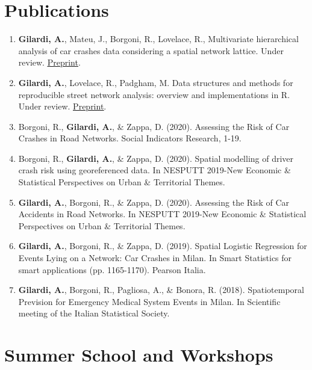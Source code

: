 \documentclass[11pt,a4paper,sans]{moderncv}
\begin{document}
	\section{Publications}
	\begin{enumerate}
		\item \textbf{Gilardi, A.}, Mateu, J., Borgoni, R., Lovelace, R., Multivariate hierarchical analysis of car crashes data considering a spatial network lattice. Under review. \underline{\href{https://arxiv.org/abs/2011.12595}{Preprint}}.  
		\item \textbf{Gilardi, A.}, Lovelace, R., Padgham, M. Data structures and methods for reproducible street network analysis: overview and implementations in R. Under review. \underline{\href{https://osf.io/78yub}{Preprint}}.
		\item Borgoni, R., \textbf{Gilardi, A.}, \& Zappa, D. (2020). Assessing the Risk of Car Crashes in Road Networks. Social Indicators Research, 1-19.
		\item Borgoni, R., \textbf{Gilardi, A.}, \& Zappa, D. (2020). Spatial modelling of driver crash risk using georeferenced data. In NESPUTT 2019-New Economic \& Statistical Perspectives on Urban \& Territorial Themes.
		\item \textbf{Gilardi, A.}, Borgoni, R., \& Zappa, D. (2020). Assessing the Risk of Car Accidents in Road Networks. In NESPUTT 2019-New Economic \& Statistical Perspectives on Urban \& Territorial Themes.
		\item \textbf{Gilardi, A.}, Borgoni, R., \& Zappa, D. (2019). Spatial Logistic Regression for Events Lying on a Network: Car Crashes in Milan. In Smart Statistics for smart applications (pp. 1165-1170). Pearson Italia.
		\item \textbf{Gilardi, A.}, Borgoni, R., Pagliosa, A., \& Bonora, R. (2018). Spatiotemporal Prevision for Emergency Medical System Events in Milan. In Scientific meeting of the Italian Statistical Society.
	\end{enumerate}

	\section{Summer School and Workshops}
\end{document}

